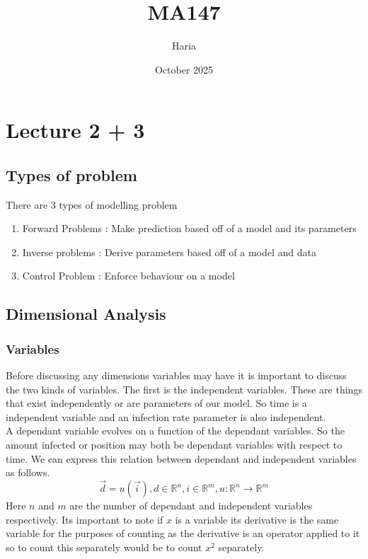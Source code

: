 \documentclass{article}
\title{MA147}
\author{Haria}
\date{October 2025}
\begin{document}
\maketitle
\newtheorem{definition}{Definition}
\newtheorem{theorem}{Theorem}
\section{Lecture 2 + 3}
\subsection{Types of problem}
There are 3 types of modelling problem
\begin{enumerate}
    \item Forward Problems : Make prediction based off of a model and its parameters
    \item Inverse problems : Derive parameters based off of a model and data
    \item Control Problem : Enforce behaviour on a model
\end{enumerate}
\subsection{Dimensional Analysis}
\subsubsection{Variables}
Before discussing any dimensions variables may have it is important to discuss the two kinds of variables. The first is the independent variables. These are things that exist independently or are parameters of our model. So time is a independent variable and an infection rate parameter is also independent.
\\
A dependant variable evolves on a function of the dependant variables. So the amount infected or position may both be dependant variables with respect to time. We can express this relation between dependant and independent variables as follows.
\[\vec{d} = u(\vec{i}) , d \in \mathbb{R}^n,i \in \mathbb{R}^m,u:\mathbb{R}^n \to \mathbb{R}^m\]
Here $n$ and $m$ are the number of dependant and independent variables respectively. Its important to note if $x$ is a variable its derivative is the same variable for the purposes of counting as the derivative is an  operator applied to it so to count this separately would be to count $x^2$ separately.
\end{document}
